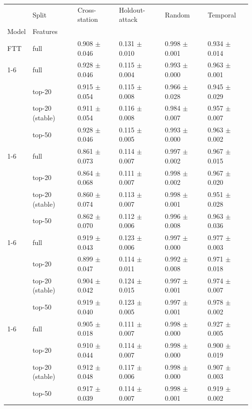 \begin{tabular}{llllll}
\toprule
 & Split & Cross-station & Holdout-attack & Random & Temporal \\
Model & Features &  &  &  &  \\
\midrule
FTT & full & 0.908 $\pm$ 0.046 & 0.131 $\pm$ 0.010 & 0.998 $\pm$ 0.001 & 0.934 $\pm$ 0.014 \\
\cline{1-6}
\multirow[t]{4}{*}{LR} & full & 0.928 $\pm$ 0.046 & 0.115 $\pm$ 0.004 & 0.993 $\pm$ 0.000 & 0.963 $\pm$ 0.001 \\
 & top-20 & 0.915 $\pm$ 0.054 & 0.115 $\pm$ 0.008 & 0.966 $\pm$ 0.028 & 0.945 $\pm$ 0.029 \\
 & top-20 (stable) & 0.911 $\pm$ 0.054 & 0.116 $\pm$ 0.008 & 0.984 $\pm$ 0.007 & 0.957 $\pm$ 0.007 \\
 & top-50 & 0.928 $\pm$ 0.046 & 0.115 $\pm$ 0.005 & 0.993 $\pm$ 0.000 & 0.963 $\pm$ 0.002 \\
\cline{1-6}
\multirow[t]{4}{*}{LightGBM} & full & 0.861 $\pm$ 0.073 & 0.114 $\pm$ 0.007 & 0.997 $\pm$ 0.002 & 0.967 $\pm$ 0.015 \\
 & top-20 & 0.864 $\pm$ 0.068 & 0.111 $\pm$ 0.007 & 0.998 $\pm$ 0.002 & 0.967 $\pm$ 0.020 \\
 & top-20 (stable) & 0.860 $\pm$ 0.074 & 0.113 $\pm$ 0.007 & 0.998 $\pm$ 0.001 & 0.951 $\pm$ 0.028 \\
 & top-50 & 0.862 $\pm$ 0.070 & 0.112 $\pm$ 0.006 & 0.996 $\pm$ 0.008 & 0.963 $\pm$ 0.036 \\
\cline{1-6}
\multirow[t]{4}{*}{MLP} & full & 0.919 $\pm$ 0.043 & 0.123 $\pm$ 0.006 & 0.997 $\pm$ 0.000 & 0.977 $\pm$ 0.003 \\
 & top-20 & 0.899 $\pm$ 0.047 & 0.114 $\pm$ 0.011 & 0.992 $\pm$ 0.008 & 0.971 $\pm$ 0.018 \\
 & top-20 (stable) & 0.904 $\pm$ 0.042 & 0.124 $\pm$ 0.015 & 0.997 $\pm$ 0.001 & 0.974 $\pm$ 0.007 \\
 & top-50 & 0.919 $\pm$ 0.040 & 0.123 $\pm$ 0.005 & 0.997 $\pm$ 0.001 & 0.978 $\pm$ 0.002 \\
\cline{1-6}
\multirow[t]{4}{*}{RF} & full & 0.905 $\pm$ 0.018 & 0.111 $\pm$ 0.007 & 0.998 $\pm$ 0.000 & 0.927 $\pm$ 0.005 \\
 & top-20 & 0.910 $\pm$ 0.044 & 0.114 $\pm$ 0.007 & 0.998 $\pm$ 0.000 & 0.900 $\pm$ 0.019 \\
 & top-20 (stable) & 0.912 $\pm$ 0.048 & 0.117 $\pm$ 0.006 & 0.998 $\pm$ 0.000 & 0.907 $\pm$ 0.003 \\
 & top-50 & 0.917 $\pm$ 0.039 & 0.114 $\pm$ 0.007 & 0.998 $\pm$ 0.001 & 0.919 $\pm$ 0.002 \\

\end{tabular}
